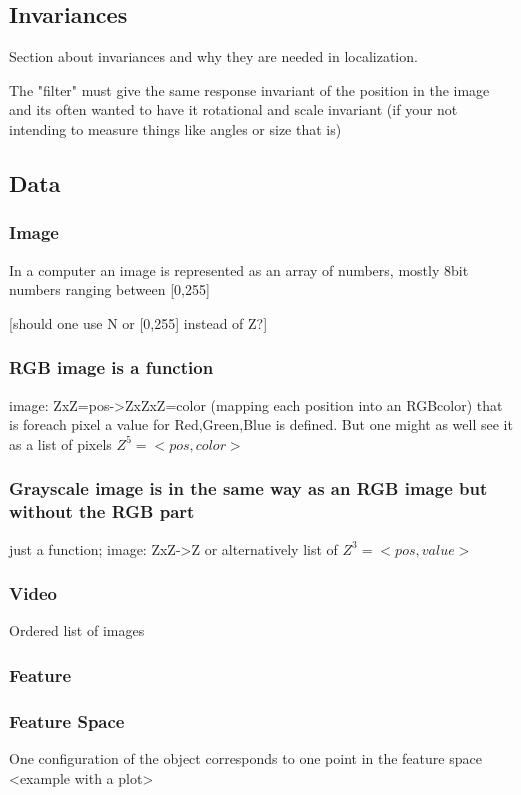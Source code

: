 \subsection{Invariances}
Section about invariances and why they are needed in localization.

The "filter" must give the same response invariant of the position in the image 
and its often wanted to have it rotational and scale invariant (if your not 
intending to measure things like angles or size that is)

\subsection{Data}
\subsubsection{Image}
In a computer an image is represented as an array of 
numbers, mostly 8bit numbers ranging between [0,255] 

[should one use N or [0,255] instead of Z?]
\subsubsection{RGB image is a function}
image: ZxZ=pos->ZxZxZ=color (mapping each position into an RGBcolor)
that is foreach pixel a value for Red,Green,Blue is defined.
But one might as well see it as a list of pixels $Z^5=<pos,color>$

\subsubsection{Grayscale image is in the same way as an RGB image but without the RGB part}
just a function;
image: ZxZ->Z
or alternatively list of $Z^3=<pos,value>$
\subsubsection{Video}
Ordered list of images


\subsubsection{Feature}

\subsubsection{Feature Space}
One configuration of the object corresponds to one point in the feature space
<example with a plot>



